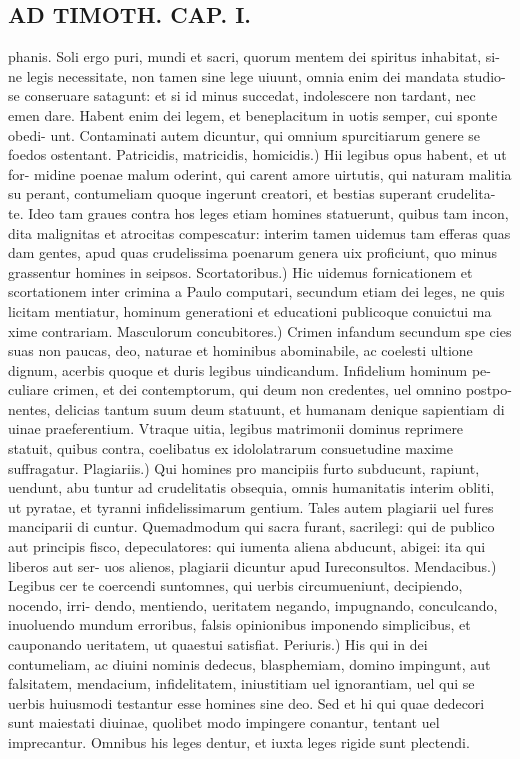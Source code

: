 \documentclass{article}
\begin{document}
\begin{pages}
\section*{AD TIMOTH. CAP. I. }
\marginpar{[ p.471 ]}\pstart phanis. Soli ergo puri, mundi et sacri, quorum mentem dei spiritus inhabitat, si- ne legis necessitate, non tamen sine lege uiuunt, omnia enim dei mandata studio- se conseruare satagunt: et si id minus succedat, indolescere non tardant, nec emen dare. Habent enim dei legem, et beneplacitum in uotis semper, cui sponte obedi- unt. Contaminati autem dicuntur, qui omnium spurcitiarum genere se foedos ostentant. Patricidis, matricidis, homicidis.) Hii legibus opus habent, et ut for- midine poenae malum oderint, qui carent amore uirtutis, qui naturam malitia su perant, contumeliam quoque ingerunt creatori, et bestias superant crudelita- te. Ideo tam graues contra hos leges etiam homines statuerunt, quibus tam incon, dita malignitas et atrocitas compescatur: interim tamen uidemus tam efferas quas dam gentes, apud quas crudelissima poenarum genera uix proficiunt, quo minus grassentur homines in seipsos. Scortatoribus.) Hic uidemus fornicationem et scortationem inter crimina a Paulo computari, secundum etiam dei leges, ne quis licitam mentiatur, hominum generationi et educationi publicoque conuictui ma xime contrariam. Masculorum concubitores.) Crimen infandum secundum spe cies suas non paucas, deo, naturae et hominibus abominabile, ac coelesti ultione dignum, acerbis quoque et duris legibus uindicandum. Infidelium hominum pe- culiare crimen, et dei contemptorum, qui deum non credentes, uel omnino postpo- nentes, delicias tantum suum deum statuunt, et humanam denique sapientiam di uinae praeferentium. Vtraque uitia, legibus matrimonii dominus reprimere statuit, quibus contra, coelibatus ex idololatrarum consuetudine maxime suffragatur. Plagiariis.) Qui homines pro mancipiis furto subducunt, rapiunt, uendunt, abu tuntur ad crudelitatis obsequia, omnis humanitatis interim obliti, ut pyratae, et tyranni infidelissimarum gentium. Tales autem plagiarii uel fures manciparii di cuntur. Quemadmodum qui sacra furant, sacrilegi: qui de publico aut principis fisco, depeculatores: qui iumenta aliena abducunt, abigei: ita qui liberos aut ser- uos alienos, plagiarii dicuntur apud Iureconsultos. Mendacibus.) Legibus cer te coercendi suntomnes, qui uerbis circumueniunt, decipiendo, nocendo, irri- dendo, mentiendo, ueritatem negando, impugnando, conculcando, inuoluendo mundum erroribus, falsis opinionibus imponendo simplicibus, et cauponando ueritatem, ut quaestui satisfiat. Periuris.) His qui in dei contumeliam, ac diuini nominis dedecus, blasphemiam, domino impingunt, aut falsitatem, mendacium, infidelitatem, iniustitiam uel ignorantiam, uel qui se uerbis huiusmodi testantur esse homines sine deo. Sed et hi qui quae dedecori sunt maiestati diuinae, quolibet modo impingere conantur, tentant uel imprecantur. Omnibus his leges dentur, et iuxta leges rigide sunt plectendi.  \pend
{}
{}

\end{pages}
\end{document}

